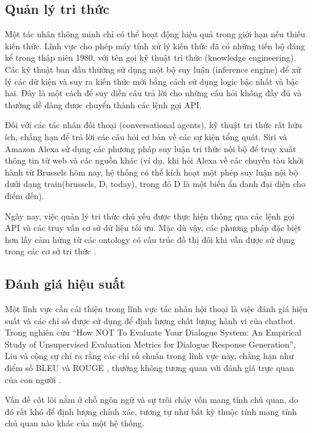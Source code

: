 \subsection{Quản lý tri thức}
\label{subsection:knowledge_management}

Một tác nhân thông minh chỉ có thể hoạt động hiệu quả trong giới hạn nếu thiếu kiến thức. Lĩnh vực cho phép máy tính xử lý kiến thức đã có những tiến bộ đáng kể trong thập niên 1980, với tên gọi kỹ thuật tri thức (knowledge engineering). Các kỹ thuật ban đầu thường sử dụng một bộ suy luận (inference engine) để xử lý các dữ kiện và suy ra kiến thức mới bằng cách sử dụng logic bậc nhất và bậc hai. Đây là một cách để suy diễn câu trả lời cho những câu hỏi không đầy đủ và thường dễ dàng được chuyển thành các lệnh gọi API.

Đối với các tác nhân đối thoại (conversational agents), kỹ thuật tri thức rất hữu ích, chẳng hạn để trả lời các câu hỏi cơ bản về các sự kiện tổng quát. Siri và Amazon Alexa sử dụng các phương pháp suy luận tri thức nội bộ để truy xuất thông tin từ web và các nguồn khác (ví dụ, khi hỏi Alexa về các chuyến tàu khởi hành từ Brussels hôm nay, hệ thống có thể kích hoạt một phép suy luận nội bộ dưới dạng train(brussels, D, today), trong đó D là một biến ẩn danh đại diện cho điểm đến).

Ngày nay, việc quản lý tri thức chủ yếu được thực hiện thông qua các lệnh gọi API và các truy vấn cơ sở dữ liệu tối ưu. Mặc dù vậy, các phương pháp đặc biệt hơn lấy cảm hứng từ các ontology có cấu trúc đồ thị đôi khi vẫn được sử dụng trong các cơ sở tri thức \cite{li2024matching}.

\subsection{Đánh giá hiệu suất}
\label{subsection:performance_assessment}

Một lĩnh vực cần cải thiện trong lĩnh vực tác nhân hội thoại là việc đánh giá hiệu suất và các chỉ số được sử dụng để định lượng chất lượng hành vi của chatbot. Trong nghiên cứu “How NOT To Evaluate Your Dialogue System: An Empirical Study of Unsupervised Evaluation Metrics for Dialogue Response Generation”, Liu và cộng sự chỉ ra rằng các chỉ số chuẩn trong lĩnh vực này, chẳng hạn như điểm số BLEU \cite{karpukhin2020dense} và ROUGE \cite{burges2005learning}, thường không tương quan với đánh giá trực quan của con người \cite{robertson2009probabilistic}.

Vấn đề cốt lõi nằm ở chỗ ngôn ngữ và sự trôi chảy vốn mang tính chủ quan, do đó rất khó để định lượng chính xác, tương tự như bất kỳ thuộc tính mang tính chủ quan nào khác của một hệ thống.

